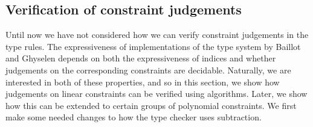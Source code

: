         

% 

% 

\subsection{Verification of constraint judgements}\label{sec:verifyinglinearjudgements}
Until now we have not considered how we can verify constraint judgements in the type rules. The expressiveness of implementations of the type system by Baillot and Ghyselen \cite{BaillotGhyselen2021} depends on both the expressiveness of indices and whether judgements on the corresponding constraints are decidable. Naturally, we are interested in both of these properties, and so in this section, we show how judgements on linear constraints can be verified using algorithms. Later, we show how this can be extended to certain groups of polynomial constraints. We first make some needed changes to how the type checker uses subtraction.
%
